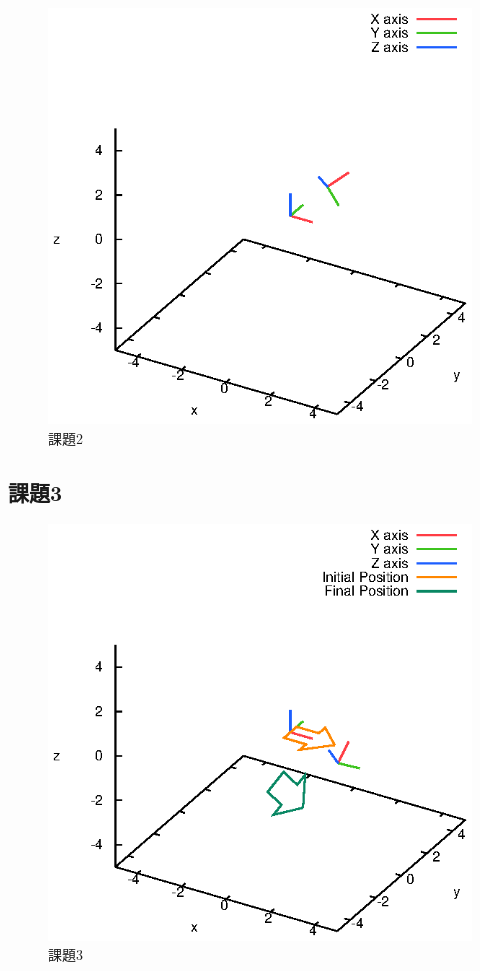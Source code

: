 \documentclass[a4paper,10pt]{jsarticle}
\begin{document}
\begin{figure}[htb]
  \begin{center}
    \includegraphics[clip,width=14cm]{fig/eps/2.eps}
  \end{center}
  \caption{課題2}
  \label{fig:課題2}
\end{figure}

\subsection{課題3}

\begin{figure}[htb]
  \begin{center}
    \includegraphics[clip,width=14cm]{fig/eps/3.eps}
  \end{center}
  \caption{課題3}
  \label{fig:課題3}
\end{figure}
\end{document}
